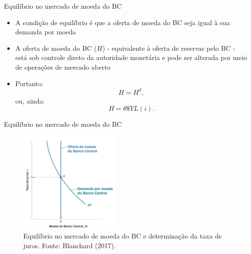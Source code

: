 \documentclass[10pt]{beamer}
\begin{document}
\begin{frame}{Equilíbrio no mercado de moeda do BC}
    \begin{itemize}
        \item A condição de equilíbrio é que a oferta de moeda do BC seja igual à sua demanda por moeda
        \bigskip
        \item A oferta de moeda do BC ($H$) - equivalente à oferta de reservas pelo BC - está sob controle direto da autoridade monetária e pode ser alterada por meio de operações de mercado aberto
        \bigskip
        \item Portanto:
        \[
            H = H^d,
        \]
        ou, ainda:
        \begin{equation}
            H = \theta \$Y L(i).
            \label{eq7}
        \end{equation}
    \end{itemize}
\end{frame}

\begin{frame}{Equilíbrio no mercado de moeda do BC}
    \begin{figure}
        \centering
        \includegraphics[width=0.45\textwidth]{./figures/aula072_fig7.JPG}
        \caption{Equilíbrio no mercado de moeda do BC e determinação da taxa de juros. Fonte: Blanchard (2017).}
        \label{fig8}
    \end{figure}
\end{frame}
\end{document}
